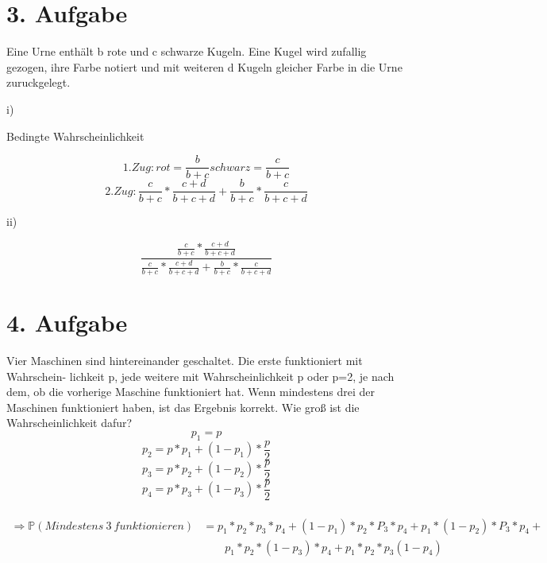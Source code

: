 \documentclass[10pt,a4paper,parskip=half]{scrartcl}
\begin{document}
\section*{3. Aufgabe}
Eine Urne enthält b rote und c schwarze Kugeln. Eine Kugel wird zufallig gezogen, ihre
Farbe notiert und mit weiteren d Kugeln gleicher Farbe in die Urne zuruckgelegt.
\begin{flushleft}
\item[i)]
\begin{description}
Bedingte Wahrscheinlichkeit
\end{description}
\end{flushleft}
\begin{displaymath}
1. Zug: rot = \frac{b}{b+c} schwarz = \frac{c}{b+c}
\end{displaymath}
\begin{displaymath}
2. Zug: \frac{c}{b+c} * \frac{c+d}{b+c+d} + \frac{b}{b+c} * \frac{c}{b+c+d}
\end{displaymath}
\begin{flushleft}
\item[ii)]
\end{flushleft}
\begin{displaymath}
\frac{\frac{c}{b+c} * \frac{c+d}{b+c+d}}{\frac{c}{b+c} * \frac{c+d}{b+c+d} + \frac{b}{b+c} * \frac{c}{b+c+d}}
\end{displaymath}

\section*{4. Aufgabe}
Vier Maschinen sind hintereinander geschaltet. Die erste funktioniert mit Wahrschein-
lichkeit p, jede weitere mit Wahrscheinlichkeit p oder p=2, je nach dem, ob die vorherige
Maschine funktioniert hat. Wenn mindestens drei der Maschinen funktioniert haben, ist
das Ergebnis korrekt. Wie groß ist die Wahrscheinlichkeit dafur?
\\[1cm]
\begin{displaymath}
p_1 = p 
\end{displaymath}
\begin{displaymath}
p_2 = p * p_1 + (1-p_1)* \frac{p}{2} 
\end{displaymath}
\begin{displaymath}
p_3 = p * p_2 + (1-p_2)* \frac{p}{2} 
\end{displaymath}
\begin{displaymath}
p_4 = p * p_3 + (1-p_3)* \frac{p}{2} 
\end{displaymath}
\\[0.6cm]
\begin{align}
\Rightarrow \mathbb{P} (Mindestens \medspace 3 \medspace funktionieren) &=  p_1 * p_2 * p_3 * p_4 + (1-p_1)*p_2*P_3*p_4 + p_1*(1-p_2)*P_3*p_4 + \nonumber \\
 &\qquad {} p_1*p_2*(1-p_3)*p_4 + p_1*p_2*p_3(1-p_4) \nonumber
\end{align}
\end{document}

